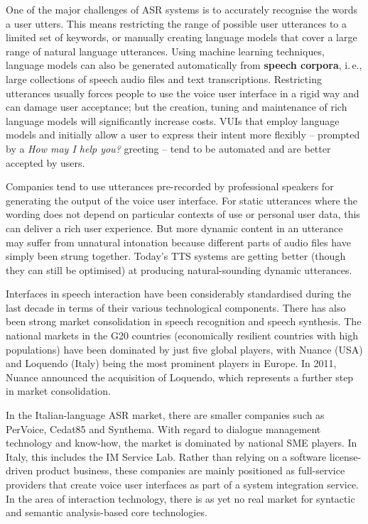 \begin{multicols}{2}
One of the major challenges of ASR systems is to accurately recognise the
words a user utters. This means restricting the range of possible user
utterances to a limited set of keywords, or manually creating language models
that cover a large range of natural language utterances. Using machine
learning techniques, language models can also be generated automatically from
\textbf{speech corpora}, i.\,e., large collections of speech audio files and
text transcriptions. Restricting utterances usually forces people to use the
voice user interface in a rigid way and can damage user acceptance; but the
creation, tuning and maintenance of rich language models will significantly
increase costs. VUIs that employ language models and initially allow a user to
express their intent more flexibly -- prompted by a \emph{How may I help
you?} greeting -- tend to be automated and are better accepted by users. 



Companies tend to use utterances pre-recorded by professional speakers
for generating the output of the voice user interface. For static
utterances where the wording does not depend on particular contexts of
use or personal user data, this can deliver a rich user
experience. But more dynamic content in an utterance may suffer from
unnatural intonation because different parts of audio files have
simply been strung together. Today's TTS systems are getting better
(though they can still be optimised) at producing natural-sounding
dynamic utterances.


Interfaces in speech interaction have been considerably standardised
during the last decade in terms of their various technological
components. There has also been strong market consolidation in speech
recognition and speech synthesis. The national markets in the G20
countries (economically resilient countries with high populations)
have been dominated by just five global players, with Nuance (USA) and
Loquendo (Italy) being the most prominent players in Europe. In 2011,
Nuance announced the acquisition of Loquendo, which represents a
further step in market consolidation.

In the Italian-language ASR market, there are smaller companies such
as PerVoice, Cedat85 and Synthema. With regard to dialogue management
technology and know-how, the market is dominated by national SME
players. In Italy, this includes the IM Service Lab. Rather than
relying on a software license-driven product business, these companies
are mainly positioned as full-service providers that create voice user
interfaces as part of a system integration service. In the area of
interaction technology, there is as yet no real market for syntactic
and semantic analysis-based core technologies.


\end{multicols}
